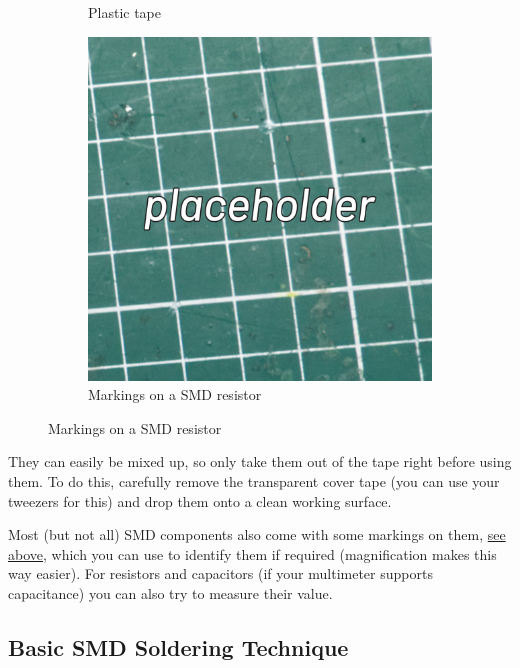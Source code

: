\documentclass[12pt, a4paper]{article}
\begin{document}
\begin{figure}[H]
\begin{subfigure}{0.3\textwidth}
        \caption*{Plastic tape}
    \end{subfigure}
    \hspace{2mm}
    \begin{subfigure}{0.3\textwidth}
        \includegraphics[width=\textwidth]{images/placeholder.jpg}
        \caption*{Markings on a SMD resistor}
        \label{fig:resistor_markings}
    \end{subfigure}
\end{figure}

They can easily be mixed up, so only take them out of the tape right before using them. To do
this, carefully remove the transparent cover tape (you can use your tweezers for this) and drop
them onto a clean working surface.

Most (but not all) SMD components also come with some markings on them,
\hyperref[fig:resistor_markings]{see above}, which you can use to identify them if required
(magnification makes this way easier). For resistors and capacitors (if your multimeter supports
capacitance) you can also try to measure their value.

\pagebreak
\subsection{Basic SMD Soldering Technique}
\label{sec:basic_smd_soldering_techniques}
\end{document}
